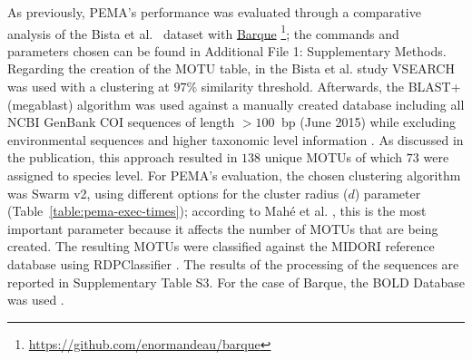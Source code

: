       As previously, PEMA's performance was evaluated through a comparative analysis of the 
      Bista et al.~\citep{bista2017annual} dataset with 
      \href{https://github.com/enormandeau/barque}{Barque} 
      \footnote{
         \href{https://github.com/enormandeau/barque}{https://github.com/enormandeau/barque}
      }; 
      the commands and parameters chosen can be found in Additional File 1: Supplementary Methods. 
      Regarding the creation of the MOTU table, in the Bista et al. \citep{bista2017annual} study VSEARCH \citep{rognes2016vsearch} was used with a clustering at $97\%$ similarity threshold. 
      Afterwards, the BLAST+ (megablast) algorithm \citep{camacho2009blast} was used against a manually created database including all NCBI GenBank COI sequences of length $>100$  bp (June 2015) while excluding environmental sequences and higher taxonomic level information \citep{bista2017annual}. 
      As discussed in the publication, this approach resulted in $138$ unique MOTUs of which $73$ were assigned to species level. 
      For PEMA's evaluation, the chosen clustering algorithm was Swarm v2, using different options for the cluster radius ($d$) parameter (Table~\ref{table:pema-exec-times}); 
      according to Mahé et al. \citep{mahe2015swarm}, this is the most important parameter because it affects the number of MOTUs that are being created. 
      The resulting MOTUs were classified against the MIDORI reference database \citep{machida2017metazoan} using RDPClassifier \citep{wang2007naive}. 
      The results of the processing of the sequences are reported in Supplementary Table S3. 
      For the case of Barque, the BOLD Database was used \citep{ratnasingham2007bold}.


